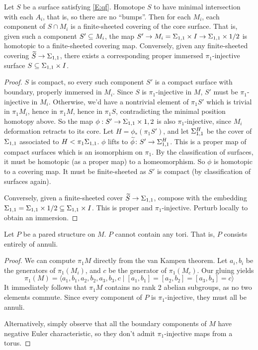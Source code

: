 \begin{lemma}\label{L:sc}

Let $S$ be a surface satisfying \eqref{E:qf}. Homotope $S$ to have minimal
intersection with each $A_i$, that is, so there are no ``bumps''.  Then for
each $M_i$, each component of $S \cap M_i$ is a finite-sheeted covering of the
core surface.  That is, given such a component $S' \subseteq M_i$, the map $S' \to
M_i = \Sigma_{1,1}\times I \to \Sigma_{1,1}\times{1/2}$ is homotopic to a finite-sheeted
covering map. Conversely, given any finite-sheeted covering $\widetilde{S} \to
\Sigma_{1,1}$, there exists a corresponding proper immersed $\pi_1$-injective
surface $S \subseteq \Sigma_{1,1}\times I$.

\end{lemma}
\begin{proof}

$S$ is compact, so every such component $S'$ is a compact surface with
boundary, properly immersed in $M_i$. Since $S$ is $\pi_1$-injective in $M$,
$S'$ must be $\pi_1$-injective in $M_i$. Otherwise, we'd have a nontrivial
element of $\pi_1S'$ which is trivial in $\pi_1M_i$, hence in $\pi_1M$, hence
in $\pi_1S$, contradicting the minimal position homotopy above. So the map
$\phi : S'\to\Sigma_{1,1}\times{1,2}$ is also $\pi_1$-injective, since $M_i$
deformation retracts to its core. Let $H = \phi_*(\pi_1S')$, and let
$\Sigma_{1,1}^H$ be the cover of $\Sigma_{1,1}$ associated to $H<\pi_1\Sigma_{1,1}$.
$\phi$ lifts to $\widetilde{\phi}\colon S'\to \Sigma_{1,1}^H$. This is a proper
map of compact surfaces which is an isomorphism on $\pi_1$.  By the
classification of surfaces, it must be homotopic (as a proper map) to
a homeomorphism. So $\phi$ is homotopic to a covering map. It must be
finite-sheeted as $S'$ is compact (by classification of surfaces again).

Conversely, given a finite-sheeted cover $\widetilde{S}\to \Sigma_{1,1}$, compose
with the embedding $\Sigma_{1,1} = \Sigma_{1,1}\times{1/2} \subseteq \Sigma_{1,1}\times I$. This is
proper and $\pi_1$-injective.  Perturb locally to obtain an immersion.

\end{proof}

\begin{lemma}

Let $P$ be a pared structure on $M$. $P$ cannot contain any tori. That is,
$P$ consists entirely of annuli.

\end{lemma}
\begin{proof}

We can compute $\pi_1M$ directly from the van Kampen theorem. Let $a_i,b_i$ be
the generators of $\pi_1(M_i)$, and $c$ be the generator of $\pi_1(M_c)$. Our
gluing yields
\[
\pi_1(M) = \langle a_1,b_1,a_2,b_2,a_3,b_3,c \mid
[a_1,b_1]=[a_2,b_2]=[a_3,b_3]=c \rangle
\]
It immediately follows that $\pi_1M$ contains no rank 2 abelian subgroups, as
no two elements commute. Since every component of $P$ is $\pi_1$-injective,
they must all be annuli.

Alternatively, simply observe that all the boundary components of $M$ have
negative Euler characteristic, so they don't admit $\pi_1$-injective maps from
a torus.

\end{proof}

